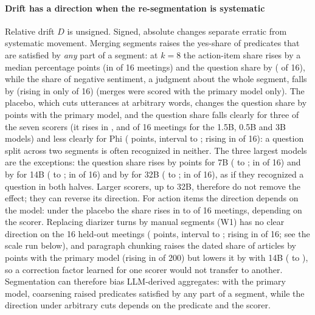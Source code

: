 \documentclass[conference]{IEEEtran}
\begin{document}
\paragraph*{Drift has a direction when the re-segmentation is systematic} Relative drift $D$ is unsigned. Signed,
absolute changes separate erratic from systematic movement. Merging segments raises the yes-share of predicates that
are satisfied by \emph{any} part of a segment: at $k=8$ the action-item share rises by a median
\nSgEsixkeightQoneabs{} percentage points (in \nSgEsixkeightQoneup{} of 16 meetings) and the question share by
\nSgEsixkeightQtwoabs{} (\nSgEsixkeightQtwoup{} of 16), while the share of negative sentiment, a judgment about the
whole segment, falls by \nSgEsixkeightQthreeabs{} (rising in only \nSgEsixkeightQthreeup{} of 16) (merges were scored
with the primary model only). The placebo, which cuts utterances at arbitrary words, changes the question share by
\nSgWtwoQtwoabs{} points with the primary model, and the question share falls clearly for three of the seven scorers (it rises
in \nSgWtwoQtwoup, \nSgWtwoQtwoMtwoup{} and \nSgWtwoQtwoMthreeup{} of 16 meetings for the 1.5B, 0.5B and 3B models) and
less clearly for Phi (\nSgWtwoQtwoMphiabs{} points, interval \nSgWtwoQtwoMphiabslo{} to \nSgWtwoQtwoMphiabshi; rising
in \nSgWtwoQtwoMphiup{} of 16): a question split across two segments is often recognized in neither. The three
largest models are the exceptions: the question share rises by \nSgWtwoQtwoMsevenabs{} points for 7B
(\nSgWtwoQtwoMsevenabslo{} to \nSgWtwoQtwoMsevenabshi; in \nSgWtwoQtwoMsevenup{} of 16) and by
\nSgWtwoQtwoMfourteenabs{} for 14B (\nSgWtwoQtwoMfourteenabslo{} to \nSgWtwoQtwoMfourteenabshi; in
\nSgWtwoQtwoMfourteenup{} of 16) and by \nSgWtwoQtwoMthirtytwoabs{} for 32B (\nSgWtwoQtwoMthirtytwoabslo{} to
\nSgWtwoQtwoMthirtytwoabshi; in \nSgWtwoQtwoMthirtytwoup{} of 16), as if they recognized a question in both halves. Larger scorers, up to 32B, therefore do not
remove the effect; they can reverse its direction. For action
items the direction depends on the model: under the placebo the share rises in \nSixPlaceboUpMin{} to
\nSixPlaceboUpMax{} of 16 meetings, depending on the scorer. Replacing diarizer turns by manual segments (W1) has no clear direction on the 16 held-out meetings
(\nSgWoneQoneabs{} points, interval \nSgWoneQoneabslo{} to \nSgWoneQoneabshi; rising in \nSgWoneQoneup{} of 16; see the
scale run below), and
paragraph chunking raises the dated share of articles by \nSgWikiQdoneabs{} points with the primary model (rising in
\nSgWikiQdoneup{} of 200) but lowers it by \nSgWikiQdoneMfourteenabs{} with 14B (\nSgWikiQdoneMfourteenabslo{} to
\nSgWikiQdoneMfourteenabshi), so a correction factor learned for one scorer would not transfer to another. Segmentation can therefore bias LLM-derived aggregates: with the primary model, coarsening raised predicates satisfied by
any part of a segment, while the direction under arbitrary cuts depends on the predicate and the scorer.
\end{document}
